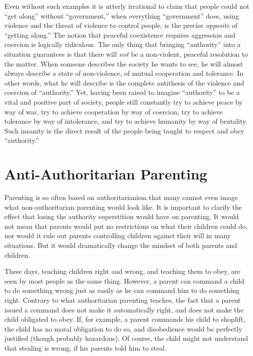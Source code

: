 \documentclass{book}
\begin{document}
Even without such examples it is utterly irrational to claim that people could not \enquote{get along} without \enquote{government,} when everything \enquote{government} does, using violence and the threat of violence to control people, is the precise \emph{opposite} of \enquote{getting along.} The notion that peaceful coexistence requires aggression and coercion is logically ridiculous. The only thing that bringing \enquote{authority} into a situation guarantees is that there will \emph{not} be a non-violent, peaceful resolution to the matter. When someone describes the society he wants to see, he will almost always describe a state of non-violence, of mutual cooperation and tolerance. In other words, what he will describe is the complete antithesis of the violence and coercion of \enquote{authority.} Yet, having been raised to imagine \enquote{authority} to be a vital and positive part of society, people still constantly try to achieve peace by way of war, try to achieve cooperation by way of coercion, try to achieve tolerance by way of intolerance, and try to achieve humanity by way of brutality. Such insanity is the direct result of the people being taught to respect and obey \enquote{authority.}

\section{Anti-Authoritarian Parenting}

Parenting is so often based on authoritarianism that many cannot even image what non-authoritarian parenting would look like. It is important to clarify the effect that losing the authority superstition would have on parenting. It would not mean that parents would put no restrictions on what their children could do, nor would it rule out parents controlling children against their will in many situations. But it would dramatically change the mindset of both parents and children.

These days, teaching children right and wrong, and teaching them to obey, are seen by most people as the same thing. However, a parent can command a child to do something wrong just as easily as he can command him to do something right. Contrary to what authoritarian parenting teaches, the fact that a parent issued a command does not make it automatically right, and does not make the child obligated to obey. If, for example, a parent commands his child to shoplift, the child has no moral obligation to do so, and disobedience would be perfectly justified (though probably hazardous). Of course, the child might not understand that stealing is wrong, if his parents told him to steal.
\end{document}
